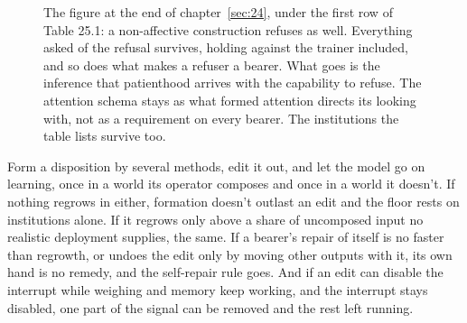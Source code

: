 \begin{figure}[htbp]
{}
\caption{The figure at the end of chapter~\ref{sec:24}, under the first row of Table 25.1: a non-affective construction refuses as well. Everything asked of the refusal survives, holding against the trainer included, and so does what makes a refuser a bearer. What goes is the inference that patienthood arrives with the capability to refuse. The attention schema stays as what formed attention directs its looking with, not as a requirement on every bearer. The institutions the table lists survive too.}
\end{figure}


Form a disposition by several methods, edit it out, and let the model go on learning, once in a world its operator composes and once in a world it doesn't. If nothing regrows in either, formation doesn't outlast an edit and the floor rests on institutions alone. If it regrows only above a share of uncomposed input no realistic deployment supplies, the same. If a bearer's repair of itself is no faster than regrowth, or undoes the edit only by moving other outputs with it, its own hand is no remedy, and the self-repair rule goes. And if an edit can disable the interrupt while weighing and memory keep working, and the interrupt stays disabled, one part of the signal can be removed and the rest left running.

